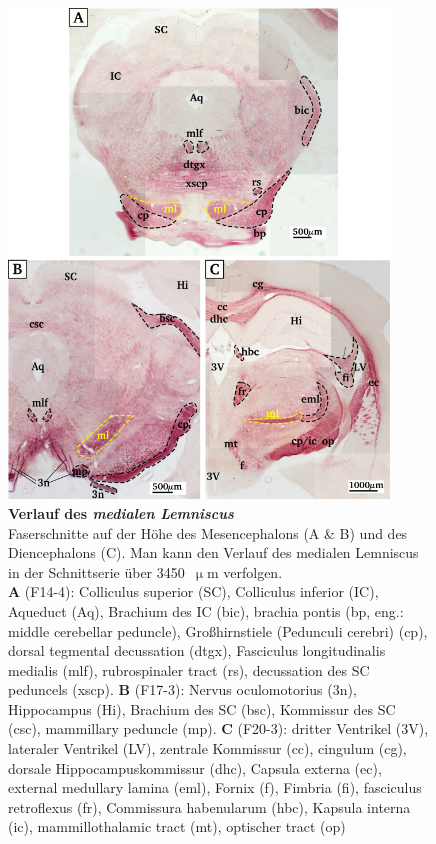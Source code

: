 \documentclass[12pt,a4paper,pdftex]{article}
\begin{document}
\begin{figure}[H]
    \centering
    \includegraphics[width = 0.9\textwidth] {pictures/somatosensory/medial_lemniscus.png}
    \caption[Verlauf des \textit{medialen Lemniscus}]{\small{\textbf{Verlauf des \textit{medialen Lemniscus}}\\
    Faserschnitte auf der Höhe des Mesencephalons (A \& B) und des Diencephalons (C). Man kann den Verlauf des medialen Lemniscus in der Schnittserie über 3450~$\upmu$m verfolgen.\\
    \textbf{A} (F14-4): Colliculus superior (SC), Colliculus inferior (IC), Aqueduct (Aq), Brachium des IC (bic), brachia pontis (bp, eng.: middle cerebellar peduncle), Großhirnstiele (Pedunculi cerebri) (cp), dorsal tegmental decussation (dtgx), Fasciculus longitudinalis medialis (mlf), rubrospinaler tract (rs), decussation des SC peduncels (xscp).
    \textbf{B} (F17-3): Nervus oculomotorius (3n), Hippocampus (Hi), Brachium des SC (bsc), Kommissur des SC (csc), mammillary peduncle (mp).
    \textbf{C} (F20-3): dritter Ventrikel (3V), lateraler Ventrikel (LV), zentrale Kommissur (cc), cingulum (cg), dorsale Hippocampuskommissur (dhc), Capsula externa (ec), external medullary lamina (eml), Fornix (f), Fimbria (fi), fasciculus retroflexus (fr), Commissura habenularum (hbc), Kapsula interna (ic), mammillothalamic tract (mt), optischer tract (op)}}
    \label{fig:medialer_lemniscus}
\end{figure}
\end{document}
